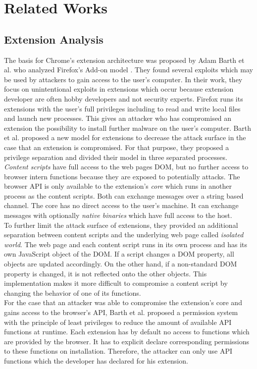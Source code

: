 
\section{Related Works}

	\subsection{Extension Analysis}
	
		The basis for Chrome's extension architecture was proposed by Adam Barth et al. who analyzed Firefox's Add-on model \cite{Barth10protectingbrowsers}. They found several exploits which may be used by attackers to gain access to the user's computer. In their work, they focus on unintentional exploits in extensions which occur because extension developer are often hobby developers and not security experts. Firefox runs its extensions with the user's full privileges including to read and write local files and launch new processes. This gives an attacker who has compromised an extension the possibility to install further malware on the user's computer. Barth et al. proposed a new model for extensions to decrease the attack surface in the case that an extension is compromised. For that purpose, they  proposed a privilege separation and divided their model in three separated processes. \textit{Content scripts} have full access to the web pages DOM, but no further access to browser intern functions because they are exposed to potentially attacks. The browser API is only available to the extension's \textit{core} which runs in another process as the content scripts. Both can exchange messages over a string based channel. The core has no direct access to the user's machine. It can exchange messages with optionally \textit{native binaries} which have full access to the host. \\
		To further limit the attack surface of extensions, they provided an additional separation between content scripts and the underlying web page called \textit{isolated world}. The web page and each content script runs in its own process and has its own JavaScript object of the DOM. If a script changes a DOM property, all objects are updated accordingly. On the other hand, if a non-standard DOM property is changed, it is not reflected onto the other objects. This implementation makes it more difficult to compromise a content script by changing the behavior of one of its functions. \\
		For the case that an attacker was able to compromise the extension's core and gains access to the browser's API, Barth et al. proposed a permission system with the principle of least privileges to reduce the amount of available API functions at runtime. Each extension has by default no access to functions which are provided by the browser. It has to explicit declare corresponding permissions to these functions on installation. Therefore, the attacker can only use API functions which the developer has declared for his extension. \\
		
